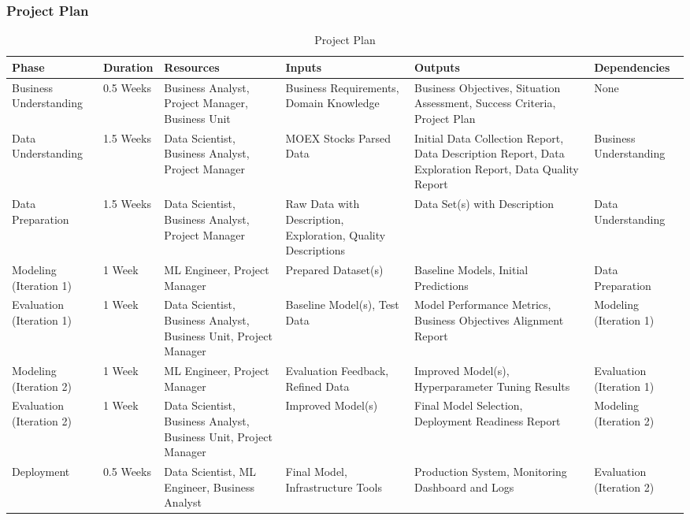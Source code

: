 \documentclass[oneside,final,12pt,a4paper]{extreport}
\begin{document}
\subsubsection{Project Plan}
\begin{table}[h!]
\centering
\small
\begin{tabular}{|p{2.3cm}|p{1.6cm}|p{2.5cm}|p{2.5cm}|p{2.5cm}|p{2.5cm}|}
\hline
\textbf{Phase} & \textbf{Duration} & \textbf{Resources} & \textbf{Inputs} & \textbf{Outputs} & \textbf{Dependencies} \\
\hline
Business Understanding & 0.5 Weeks & Business Analyst, Project Manager, Business Unit & Business Requirements, Domain Knowledge & Business Objectives, Situation Assessment, Success Criteria, Project Plan & None \\
\hline
Data Understanding & 1.5 Weeks & Data Scientist, Business Analyst, Project Manager & MOEX Stocks Parsed Data & Initial Data Collection Report, Data Description Report, Data Exploration Report, Data Quality Report & Business Understanding \\
\hline
Data Preparation & 1.5 Weeks & Data Scientist, Business Analyst, Project Manager & Raw Data with Description, Exploration, Quality Descriptions & Data Set(s) with Description & Data Understanding \\
\hline
Modeling (Iteration 1) & 1 Week & ML Engineer, Project Manager & Prepared Dataset(s) & Baseline Models, Initial Predictions & Data Preparation \\
\hline
Evaluation (Iteration 1) & 1 Week & Data Scientist, Business Analyst, Business Unit, Project Manager & Baseline Model(s), Test Data & Model Performance Metrics, Business Objectives Alignment Report & Modeling (Iteration 1) \\
\hline
Modeling (Iteration 2) & 1 Week & ML Engineer, Project Manager & Evaluation Feedback, Refined Data & Improved Model(s), Hyperparameter Tuning Results & Evaluation (Iteration 1) \\
\hline
Evaluation (Iteration 2) & 1 Week & Data Scientist, Business Analyst, Business Unit, Project Manager & Improved Model(s) & Final Model Selection, Deployment Readiness Report & Modeling (Iteration 2) \\
\hline
Deployment & 0.5 Weeks & Data Scientist, ML Engineer, Business Analyst & Final Model, Infrastructure Tools & Production System, Monitoring Dashboard and Logs & Evaluation (Iteration 2) \\
\hline
\end{tabular}
\caption{Project Plan}
\label{tab:tab1}
\end{table}
\end{document}
